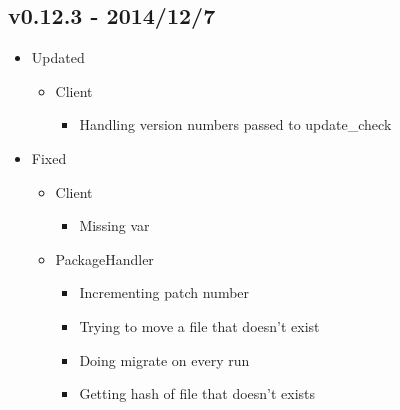 \documentclass[letterpaper,10pt,english]{sphinxmanual}
\begin{document}
\subsection{v0.12.3 - 2014/12/7}
\label{release_history:v0-12-3-2014-12-7}\begin{itemize}
\item {} 
Updated
\begin{itemize}
\item {} 
Client
\begin{itemize}
\item {} 
Handling version numbers passed to update\_check

\end{itemize}

\end{itemize}

\item {} 
Fixed
\begin{itemize}
\item {} 
Client
\begin{itemize}
\item {} 
Missing var

\end{itemize}

\item {} 
PackageHandler
\begin{itemize}
\item {} 
Incrementing patch number

\item {} 
Trying to move a file that doesn't exist

\item {} 
Doing migrate on every run

\item {} 
Getting hash of file that doesn't exists

\end{itemize}

\end{itemize}

\end{itemize}
\end{document}
